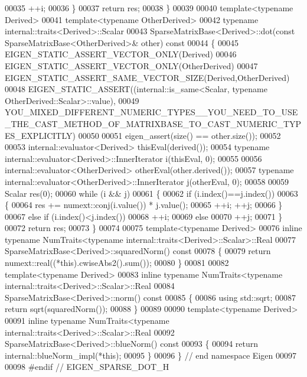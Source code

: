 \begin{DoxyCode}
00035     ++i;
00036   \}
00037   \textcolor{keywordflow}{return} res;
00038 \}
00039 
00040 \textcolor{keyword}{template}<\textcolor{keyword}{typename} Derived>
00041 \textcolor{keyword}{template}<\textcolor{keyword}{typename} OtherDerived>
00042 \textcolor{keyword}{typename} internal::traits<Derived>::Scalar
00043 SparseMatrixBase<Derived>::dot(\textcolor{keyword}{const} SparseMatrixBase<OtherDerived>& other)\textcolor{keyword}{ const}
00044 \textcolor{keyword}{}\{
00045   EIGEN\_STATIC\_ASSERT\_VECTOR\_ONLY(Derived)
00046   EIGEN\_STATIC\_ASSERT\_VECTOR\_ONLY(OtherDerived)
00047   EIGEN\_STATIC\_ASSERT\_SAME\_VECTOR\_SIZE(Derived,OtherDerived)
00048   EIGEN\_STATIC\_ASSERT((internal::is\_same<Scalar, typename OtherDerived::Scalar>::value),
00049     
      YOU\_MIXED\_DIFFERENT\_NUMERIC\_TYPES\_\_YOU\_NEED\_TO\_USE\_THE\_CAST\_METHOD\_OF\_MATRIXBASE\_TO\_CAST\_NUMERIC\_TYPES\_EXPLICITLY)
00050 
00051   eigen\_assert(size() == other.size());
00052 
00053   internal::evaluator<Derived> thisEval(derived());
00054   \textcolor{keyword}{typename} internal::evaluator<Derived>::InnerIterator i(thisEval, 0);
00055   
00056   internal::evaluator<OtherDerived>  otherEval(other.derived());
00057   \textcolor{keyword}{typename} internal::evaluator<OtherDerived>::InnerIterator j(otherEval, 0);
00058 
00059   Scalar res(0);
00060   \textcolor{keywordflow}{while} (i && j)
00061   \{
00062     \textcolor{keywordflow}{if} (i.index()==j.index())
00063     \{
00064       res += numext::conj(i.value()) * j.value();
00065       ++i; ++j;
00066     \}
00067     \textcolor{keywordflow}{else} \textcolor{keywordflow}{if} (i.index()<j.index())
00068       ++i;
00069     \textcolor{keywordflow}{else}
00070       ++j;
00071   \}
00072   \textcolor{keywordflow}{return} res;
00073 \}
00074 
00075 \textcolor{keyword}{template}<\textcolor{keyword}{typename} Derived>
00076 \textcolor{keyword}{inline} \textcolor{keyword}{typename} NumTraits<typename internal::traits<Derived>::Scalar>::Real
00077 SparseMatrixBase<Derived>::squaredNorm()\textcolor{keyword}{ const}
00078 \textcolor{keyword}{}\{
00079   \textcolor{keywordflow}{return} numext::real((*this).cwiseAbs2().sum());
00080 \}
00081 
00082 \textcolor{keyword}{template}<\textcolor{keyword}{typename} Derived>
00083 \textcolor{keyword}{inline} \textcolor{keyword}{typename} NumTraits<typename internal::traits<Derived>::Scalar>::Real
00084 SparseMatrixBase<Derived>::norm()\textcolor{keyword}{ const}
00085 \textcolor{keyword}{}\{
00086   \textcolor{keyword}{using} std::sqrt;
00087   \textcolor{keywordflow}{return} sqrt(squaredNorm());
00088 \}
00089 
00090 \textcolor{keyword}{template}<\textcolor{keyword}{typename} Derived>
00091 \textcolor{keyword}{inline} \textcolor{keyword}{typename} NumTraits<typename internal::traits<Derived>::Scalar>::Real
00092 SparseMatrixBase<Derived>::blueNorm()\textcolor{keyword}{ const}
00093 \textcolor{keyword}{}\{
00094   \textcolor{keywordflow}{return} internal::blueNorm\_impl(*\textcolor{keyword}{this});
00095 \}
00096 \} \textcolor{comment}{// end namespace Eigen}
00097 
00098 \textcolor{preprocessor}{#endif // EIGEN\_SPARSE\_DOT\_H}
\end{DoxyCode}
